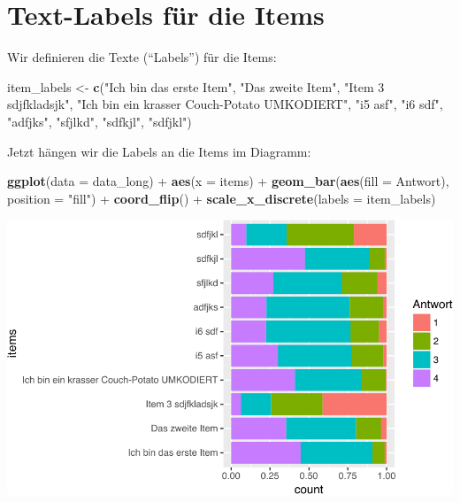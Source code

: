 \documentclass[12pt,ngerman,]{book}
\newenvironment{Shaded}{\begin{snugshade}}{\end{snugshade}}
\newcommand{\KeywordTok}[1]{\textcolor[rgb]{0.13,0.29,0.53}{\textbf{{#1}}}}
\newcommand{\DataTypeTok}[1]{\textcolor[rgb]{0.13,0.29,0.53}{{#1}}}
\newcommand{\StringTok}[1]{\textcolor[rgb]{0.31,0.60,0.02}{{#1}}}
\newcommand{\NormalTok}[1]{{#1}}
\renewenvironment{Shaded}{\begin{kframe}}{\end{kframe}}
\begin{document}
\section{Text-Labels für die Items}\label{text-labels-fur-die-items}

Wir definieren die Texte (``Labels'') für die Items:

\begin{Shaded}
\begin{Highlighting}[]
\NormalTok{item_labels <-}\StringTok{ }\KeywordTok{c}\NormalTok{(}\StringTok{"Ich bin das erste Item"}\NormalTok{,}
                 \StringTok{"Das zweite Item"}\NormalTok{,}
                 \StringTok{"Item 3 sdjfkladsjk"}\NormalTok{,}
                 \StringTok{"Ich bin ein krasser Couch-Potato UMKODIERT"}\NormalTok{,}
\StringTok{"i5 asf"}\NormalTok{, }\StringTok{"i6 sdf"}\NormalTok{, }\StringTok{"adfjks"}\NormalTok{, }\StringTok{"sfjlkd"}\NormalTok{, }\StringTok{"sdfkjl"}\NormalTok{, }\StringTok{"sdfjkl"}\NormalTok{)}
\end{Highlighting}
\end{Shaded}

Jetzt hängen wir die Labels an die Items im Diagramm:

\begin{Shaded}
\begin{Highlighting}[]
\KeywordTok{ggplot}\NormalTok{(}\DataTypeTok{data =} \NormalTok{data_long) +}
\StringTok{  }\KeywordTok{aes}\NormalTok{(}\DataTypeTok{x =} \NormalTok{items)  +}
\StringTok{  }\KeywordTok{geom_bar}\NormalTok{(}\KeywordTok{aes}\NormalTok{(}\DataTypeTok{fill =} \NormalTok{Antwort), }\DataTypeTok{position =} \StringTok{"fill"}\NormalTok{) +}
\StringTok{  }\KeywordTok{coord_flip}\NormalTok{() +}
\StringTok{  }\KeywordTok{scale_x_discrete}\NormalTok{(}\DataTypeTok{labels =} \NormalTok{item_labels)}
\end{Highlighting}
\end{Shaded}

\begin{center}\includegraphics[width=0.7\linewidth]{056_Fallstudie_Visualisierung_files/figure-latex/unnamed-chunk-12-1} \end{center}
\end{document}
